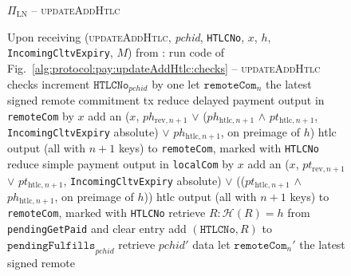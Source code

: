 
  \begin{figure}[H]
    \begin{protocolbox}{$\Pi_{\mathrm{LN}}$ -- \textsc{updateAddHtlc}}
      \begin{algorithmic}[1]
        \State Upon receiving (\textsc{updateAddHtlc}, \textit{pchid},
        \texttt{HTLCNo}, $x$, $h$, \texttt{IncomingCltvExpiry}, $M$) from \bob:
        \Indent
          \State run code of Fig.~\ref{alg:protocol:pay:updateAddHtlc:checks} --
          \textsc{updateAddHtlc} checks
          \State increment $\mathtt{HTLCNo}_{\mathit{pchid}}$ by one
          \State let $\mathtt{remoteCom}_n$ the latest signed remote commitment
          tx
          \State reduce delayed payment output in \texttt{remoteCom} by $x$
          \State add an ($x$, $ph_{\mathrm{rev}, n+1}$ $\vee$
          ($ph_{\mathrm{htlc}, n+1}$ $\wedge$ $pt_{\mathrm{htlc}, n+1}$,
          \texttt{IncomingCltvExpiry} absolute) $\vee$ $ph_{\mathrm{htlc},
          n+1}$, on preimage of $h$) htlc output (all with $n+1$ keys) to
          \texttt{remoteCom}, marked with \texttt{HTLCNo}
          \State reduce simple payment output in \texttt{localCom} by $x$
          \State add an ($x$, $pt_{\mathrm{rev}, n+1}$ $\vee$
          $pt_{\mathrm{htlc}, n+1}$, \texttt{IncomingCltvExpiry} absolute)
          $\vee$ (($pt_{\mathrm{htlc}, n+1}$ $\wedge$ $ph_{\mathrm{htlc}, n+1}$,
          on preimage of $h$)) htlc output (all with $n+1$ keys) to
          \texttt{remoteCom}, marked with \texttt{HTLCNo}
            \State retrieve $R : \mathcal{H}\left(R\right) = h$ from
            \texttt{pendingGetPaid} and clear entry
            \State add $\left(\mathtt{HTLCNo}, R\right)$ to
            $\mathtt{pendingFulfills}_{\mathit{pchid}}$
           
            \State retrieve $\mathit{pchid}'$ data
            \State let $\mathtt{remoteCom}_n'$ the latest signed remote

\end{algorithmic}
\end{protocolbox}
\end{figure}

